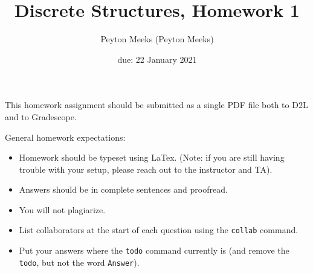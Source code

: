 \documentclass{article}
\title{Discrete Structures, Homework 1}
\author{Peyton Meeks (Peyton Meeks)}
\date{due: 22 January 2021}
\begin{document}
\maketitle

This homework assignment should be
submitted as a single PDF file both to D2L and to Gradescope.

General homework expectations:
\begin{itemize}
    \item Homework should be typeset using LaTex.  (Note: if you are still
        having trouble with your setup, please reach out to the instructor and
        TA).
    \item Answers should be in complete sentences and proofread.
    \item You will not plagiarize.
    \item List collaborators at the start of each question using the
        \texttt{collab} command.
    \item Put your answers where the \texttt{todo} command currently is (and
        remove the \texttt{todo}, but not the word \texttt{Answer}).
\end{itemize}

\end{document}
